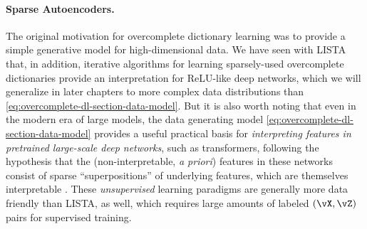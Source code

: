 \documentclass[../../book-main.tex]{subfiles}
\begin{document}



\paragraph{Sparse Autoencoders.}
The original motivation for overcomplete dictionary learning was to provide
a simple generative model for high-dimensional data. We have seen with LISTA that, in
addition, iterative algorithms for learning sparsely-used overcomplete
dictionaries provide an interpretation for ReLU-like deep networks, which we
will generalize in later chapters to more complex data distributions than
\eqref{eq:overcomplete-dl-section-data-model}.
But it is also worth noting that even in the modern era of large models, the data
generating model \eqref{eq:overcomplete-dl-section-data-model} provides a useful
practical basis for
\textit{interpreting features in pretrained large-scale deep networks}, such as
transformers, following the hypothesis that the (non-interpretable, \textit{a
priori}) features in these networks consist of sparse ``superpositions'' of
underlying features, which are themselves interpretable
\cite{elhage2022superposition}. These \textit{unsupervised} learning paradigms
are generally more data friendly than LISTA, as well, which requires large amounts
of labeled $(\vX, \vZ)$ pairs for supervised training.
\end{document}
